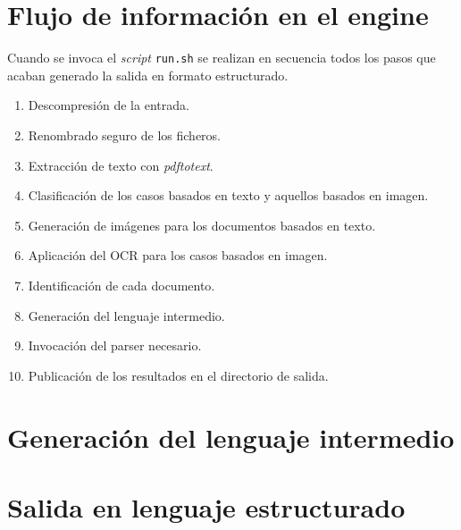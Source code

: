 
\section{Flujo de información en el engine}

Cuando se invoca el \emph{script} \verb|run.sh| se realizan en secuencia todos los pasos que acaban generado la salida en formato estructurado.

\begin{enumerate}
    \item Descompresión de la entrada.
    \item Renombrado seguro de los ficheros.
    \item Extracción de texto con \emph{pdftotext}.
    \item Clasificación de los casos basados en texto y aquellos basados en imagen.
    \item Generación de imágenes para los documentos basados en texto.
    \item Aplicación del OCR para los casos basados en imagen.
    \item Identificación de cada documento.
    \item Generación del lenguaje intermedio.
    \item Invocación del parser necesario.
    \item Publicación de los resultados en el directorio de salida.
\end{enumerate}

\section{Generación del lenguaje intermedio}
\section{Salida en lenguaje estructurado}